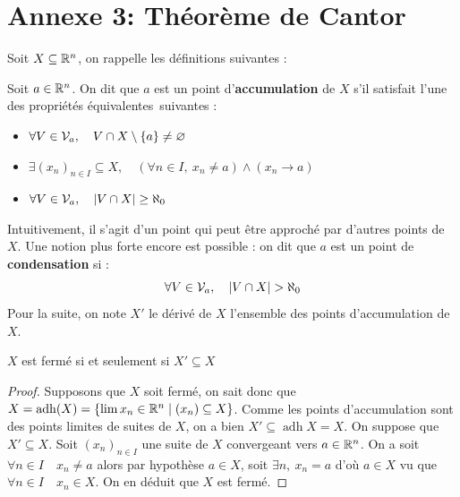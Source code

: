 \chapter*{Annexe 3: Théorème de Cantor}
\noindent Soit $X \subseteq \mathbb{R}^n$, on rappelle les définitions suivantes :

\medskip %

\noindent Soit $a \in \mathbb{R}^n$. On dit que $a$ est un point d'\textbf{accumulation} de $X$ s'il satisfait l'une des propriétés équivalentes~suivantes :
\begin{itemize}[label=\textbullet, nosep, leftmargin=1.5cm, topsep=2pt]
    \item $\forall V \in \mathcal{V}_a, \quad V \cap X \setminus \{a\} \neq \varnothing$
    \item $\exists (x_n)_{n \in I} \subseteq X, \quad (\forall n \in I, \ x_n \neq a) \land (x_n \to a)$
    \item $\forall V \in \mathcal{V}_a, \quad |V \cap X| \ge \aleph_0$
\end{itemize}

\medskip

\noindent Intuitivement, il s'agit d'un point qui peut être approché par d'autres points de $X$. Une notion plus forte encore est possible : on dit que $a$ est un point de \textbf{condensation} si :
\[
\forall V \in \mathcal{V}_a, \quad |V \cap X| > \aleph_0
\]
Pour la suite, on note $X'$ le dérivé de $X$ \ie l'ensemble des points d'accumulation de $X$.

\begin{lemme}
    $X$ est fermé si et seulement si $X'\subseteq X$
\end{lemme}
\begin{proof}
    Supposons que $X$ soit fermé, on sait donc que $X= \operatorname{adh}(X)= \{\lim x_n\in \mathbb{R}^n
    \mid (x_n)\subseteq X\}$. Comme les points d'accumulation sont des points limites de suites de $X$, on a bien $X'\subseteq \operatorname{adh} X = X$. On suppose que $X'\subseteq X$. Soit $(x_n)_{n\in I}$ une suite de $X$ convergeant vers $a\in \mathbb{R} ^n$. On a soit $\forall n\in I \quad x_n\neq a$ alors par hypothèse $a\in X$, soit $\exists n,\ x_n = a$ d'où $a\in X$ vu que $\forall n \in I\quad x_n\in X$. On en déduit que $X$ est fermé. 
\end{proof}

